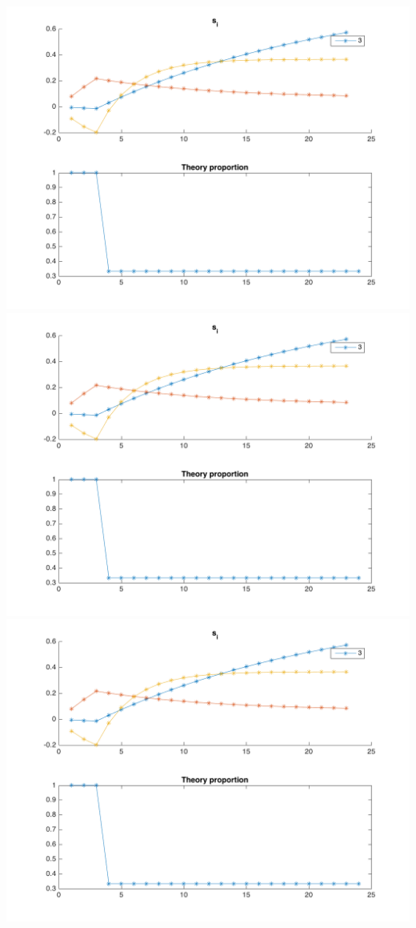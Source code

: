 \documentclass[11pt]{article}
\begin{document}
\includegraphics[width=.9\linewidth]{./img/plan1.png}
\includegraphics[width=.9\linewidth]{./img/plan2.png}
\includegraphics[width=.9\linewidth]{./img/plan3.png}
\end{document}
